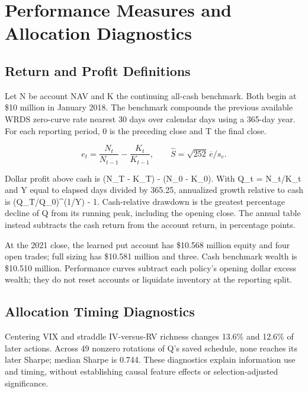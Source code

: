 \clearpage

\section{Performance Measures and Allocation Diagnostics}\label{app:e}

\subsection*{Return and Profit Definitions}

Let N be account NAV and K the continuing all-cash benchmark. Both begin at \$10 million in January 2018. The benchmark compounds the previous available WRDS zero-curve rate nearest 30 days over calendar days using a 365-day year. For each reporting period, 0 is the preceding close and T the final close.


\begin{equation*}e_t=\frac{N_t}{N_{t-1}}-\frac{K_t}{K_{t-1}},\qquad\widehat S=\sqrt{252}\,\overline{e}/s_e.\end{equation*}

Dollar profit above cash is (N\_T - K\_T) - (N\_0 - K\_0). With Q\_t = N\_t/K\_t and Y equal to elapsed days divided by 365.25, annualized growth relative to cash is (Q\_T/Q\_0)\textasciicircum{}(1/Y) - 1. Cash-relative drawdown is the greatest percentage decline of Q from its running peak, including the opening close. The annual table instead subtracts the cash return from the account return, in percentage points.


At the 2021 close, the learned put account has \$10.568 million equity and four open trades; full sizing has \$10.581 million and three. Cash benchmark wealth is \$10.510 million. Performance curves subtract each policy's opening dollar excess wealth; they do not reset accounts or liquidate inventory at the reporting split.


\subsection*{Allocation Timing Diagnostics}

Centering VIX and straddle IV-versus-RV richness changes 13.6\% and 12.6\% of later actions. Across 49 nonzero rotations of Q's saved schedule, none reaches its later Sharpe; median Sharpe is 0.744. These diagnostics explain information use and timing, without establishing causal feature effects or selection-adjusted significance.


